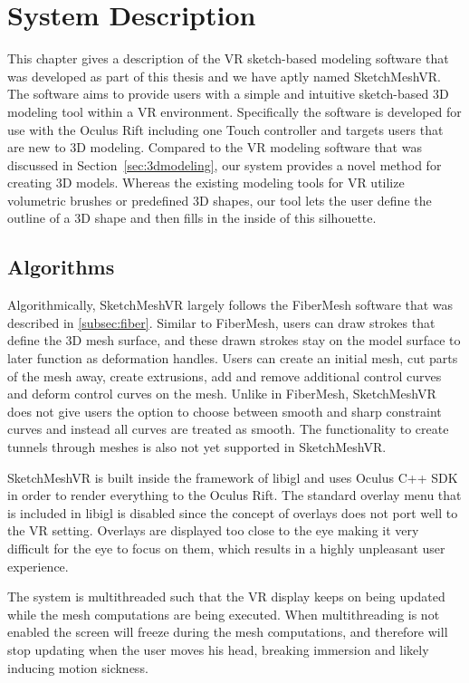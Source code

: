 \chapter{System Description}
\label{chap:system}
This chapter gives a description of the VR sketch-based modeling software that was developed as part of this thesis and we have aptly named SketchMeshVR. The software aims to provide users with a simple and intuitive sketch-based 3D modeling tool within a VR environment. Specifically the software is developed for use with the Oculus Rift including one Touch controller and targets users that are new to 3D modeling. Compared to the VR modeling software that was discussed in Section~\ref{sec:3dmodeling}, our system provides a novel method for creating 3D models. Whereas the existing modeling tools for VR utilize volumetric brushes or predefined 3D shapes, our tool lets the user define the outline of a 3D shape and then fills in the inside of this silhouette. 

\section{Algorithms}
Algorithmically, SketchMeshVR largely follows the FiberMesh software that was described in \ref{subsec:fiber}. Similar to FiberMesh, users can draw strokes that define the 3D mesh surface, and these drawn strokes stay on the model surface to later function as deformation handles. Users can create an initial mesh, cut parts of the mesh away, create extrusions, add and remove additional control curves and deform control curves on the mesh. Unlike in FiberMesh, SketchMeshVR does not give users the option to choose between smooth and sharp constraint curves and instead all curves are treated as smooth. The functionality to create tunnels through meshes is also not yet supported in SketchMeshVR.  

SketchMeshVR is built inside the framework of libigl \cite{Jacobson2017} and uses Oculus C++ SDK in order to render everything to the Oculus Rift. The standard overlay menu that is included in libigl is disabled since the concept of overlays does not port well to the VR setting. Overlays are displayed too close to the eye making it very difficult for the eye to focus on them, which results in a highly unpleasant user experience. 

The system is multithreaded such that the VR display keeps on being updated while the mesh computations are being executed. When multithreading is not enabled the screen will freeze during the mesh computations, and therefore will stop updating when the user moves his head, breaking immersion and likely inducing motion sickness. 

